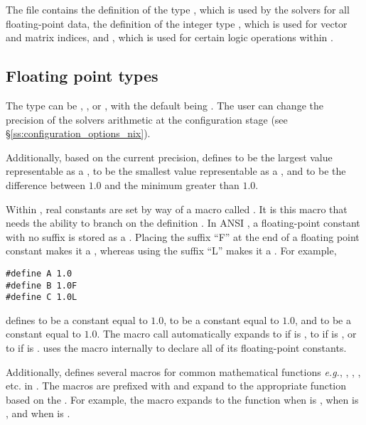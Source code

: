 %
The  file contains the definition of the type ,
which is used by the {\sundials} solvers for all floating-point data, the definition
of the integer type , which is used for vector and matrix indices,
and , which is used for certain logic operations within {\sundials}.


\subsection{Floating point types}

The type  can be , , or , with
the default being .
The user can change the precision of the {\sundials} solvers arithmetic at the
configuration stage (see \S\ref{ss:configuration_options_nix}).

Additionally, based on the current precision,  defines
 to be the largest value representable as a ,
 to be the smallest value representable as a , and
 to be the difference between $1.0$ and the minimum 
greater than $1.0$.

Within {\sundials}, real constants are set by way of a macro called
.  It is this macro that needs the ability to branch on the
definition .  In ANSI {\CC}, a floating-point constant with no
suffix is stored as a .  Placing the suffix ``F'' at the
end of a floating point constant makes it a , whereas using the suffix
``L'' makes it a .  For example,
\begin{verbatim}
#define A 1.0
#define B 1.0F
#define C 1.0L
\end{verbatim}
defines  to be a  constant equal to $1.0$,  to be a
 constant equal to $1.0$, and  to be a  constant
equal to $1.0$.  The macro call  automatically expands to 
if  is , to  if  is ,
or to  if  is .  {\sundials} uses the
 macro internally to declare all of its floating-point constants.

Additionally, {\sundials} defines several macros for common mathematical
functions \textit{e.g.}, , , , etc. in
. The macros are prefixed with  and expand to the
appropriate  function based on the . For example, the macro
 expands to the  function  when  is
,  when  is , and  when
 is .

